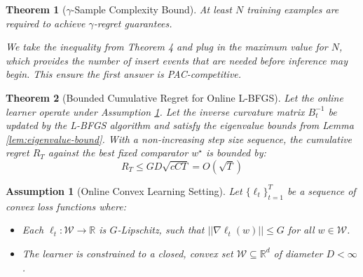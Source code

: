 \documentclass[a4paper,12pt]{article}
\newtheorem{theorem}{Theorem}
\newtheorem{assumption}{Assumption}
\begin{document}
\begin{theorem} [$\gamma$-Sample Complexity Bound]

At least $N$ training examples are required to achieve $\gamma$-regret guarantees.

We take the inequality from Theorem 4 and plug in the maximum value for $N$, which provides the number of insert events that are needed before inference may begin. This ensure the first answer is PAC-competitive.

\end{theorem}

\begin{theorem}[Bounded Cumulative Regret for Online L-BFGS]
\label{thm:regret-bound}
Let the online learner operate under Assumption \ref{assum:online-setting}. Let the inverse curvature matrix $B_t^{-1}$ be updated by the L-BFGS algorithm and satisfy the eigenvalue bounds from Lemma \ref{lem:eigenvalue-bound}. With a non-increasing step size sequence, the cumulative regret $R_T$ against the best fixed comparator $w^\star$ is bounded by:
$$
R_T \le GD\sqrt{cCT} = O(\sqrt{T})
$$
\end{theorem}

\begin{assumption}[Online Convex Learning Setting]
\label{assum:online-setting}
Let $\{\ell_t\}_{t=1}^T$ be a sequence of convex loss functions where:
\begin{itemize}
    \item Each $\ell_t: \mathcal{W} \to \mathbb{R}$ is $G$-Lipschitz, such that $||\nabla\ell_t(w)|| \le G$ for all $w \in \mathcal{W}$.
    \item The learner is constrained to a closed, convex set $\mathcal{W} \subseteq \mathbb{R}^d$ of diameter $D < \infty$.
\end{itemize}
\end{assumption}
\end{document}

